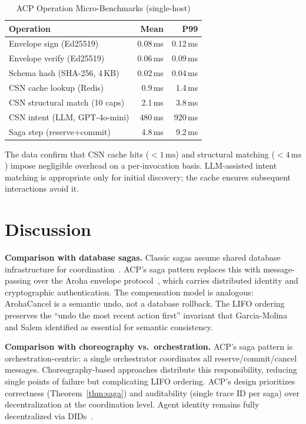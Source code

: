\documentclass[conference]{IEEEtran}
\begin{document}
\begin{table}[t]
\centering
\caption{ACP Operation Micro-Benchmarks (single-host)}
\label{tab:bench}
{\small
\begin{tabular}{@{}lrr@{}}
\toprule
\textbf{Operation} & \textbf{Mean} & \textbf{P99} \\
\midrule
Envelope sign (Ed25519)        & 0.08\,ms & 0.12\,ms \\
Envelope verify (Ed25519)      & 0.06\,ms & 0.09\,ms \\
Schema hash (SHA-256, 4\,KB)   & 0.02\,ms & 0.04\,ms \\
CSN cache lookup (Redis)       & 0.9\,ms  & 1.4\,ms  \\
CSN structural match (10 caps) & 2.1\,ms  & 3.8\,ms  \\
CSN intent (LLM, GPT-4o-mini)  & 480\,ms  & 920\,ms  \\
Saga step (reserve+commit)     & 4.8\,ms  & 9.2\,ms  \\
\bottomrule
\end{tabular}
}
\end{table}

The data confirm that CSN cache hits ($< 1\,\text{ms}$) and
structural matching ($< 4\,\text{ms}$) impose negligible overhead
on a per-invocation basis.  LLM-assisted intent matching is
appropriate only for initial discovery; the cache ensures subsequent
interactions avoid it.

\section{Discussion}
\label{sec:discussion}

\textbf{Comparison with database sagas.}  Classic sagas assume
shared database infrastructure for coordination~\cite{garcia1987sagas}.
ACP's saga pattern replaces this with message-passing over the
Aroha envelope protocol~\cite{aroha2025p5}, which carries
distributed identity and cryptographic authentication.
The compensation model is analogous: ArohaCancel is a semantic undo,
not a database rollback.  The LIFO ordering preserves the
``undo the most recent action first'' invariant that Garcia-Molina
and Salem identified as essential for semantic consistency.

\textbf{Comparison with choreography vs.\ orchestration.}  ACP's
saga pattern is orchestration-centric: a single orchestrator
coordinates all reserve/commit/cancel messages.  Choreography-based
approaches distribute this responsibility, reducing single points of
failure but complicating LIFO ordering.  ACP's design prioritizes
correctness (Theorem~\ref{thm:saga}) and auditability (single
trace ID per saga) over decentralization at the coordination level.
Agent identity remains fully decentralized via DIDs~\cite{w3c2022did}.
\end{document}
